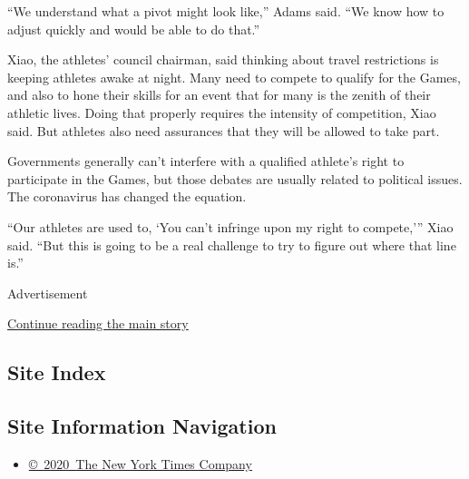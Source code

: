 ``We understand what a pivot might look like,'' Adams said. ``We know
how to adjust quickly and would be able to do that.''

Xiao, the athletes' council chairman, said thinking about travel
restrictions is keeping athletes awake at night. Many need to compete to
qualify for the Games, and also to hone their skills for an event that
for many is the zenith of their athletic lives. Doing that properly
requires the intensity of competition, Xiao said. But athletes also need
assurances that they will be allowed to take part.

Governments generally can't interfere with a qualified athlete's right
to participate in the Games, but those debates are usually related to
political issues. The coronavirus has changed the equation.

``Our athletes are used to, `You can't infringe upon my right to
compete,''' Xiao said. ``But this is going to be a real challenge to try
to figure out where that line is.''

Advertisement

\protect\hyperlink{after-bottom}{Continue reading the main story}

\hypertarget{site-index}{%
\subsection{Site Index}\label{site-index}}

\hypertarget{site-information-navigation}{%
\subsection{Site Information
Navigation}\label{site-information-navigation}}

\begin{itemize}
\tightlist
\item
  \href{https://help.nytimes3xbfgragh.onion/hc/en-us/articles/115014792127-Copyright-notice}{©~2020~The
  New York Times Company}
\end{itemize}

